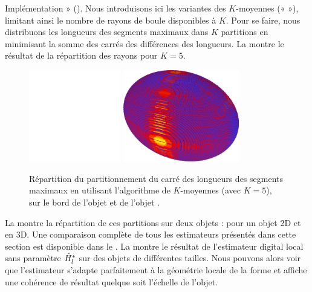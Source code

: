 Implémentation » (). Nous introduisons ici
les variantes des $K$-moyennes («  »), limitant ainsi le
nombre de rayons de boule disponibles à $K$. Pour se faire, nous distribuons les
longueurs des segments maximaux dans $K$ partitions en minimisant la somme des
carrés des différences des longueurs. La 
montre le résultat de la répartition des rayons pour $K=5$.
%
\begin{figure}[ht]{
  \begin{center}
    \includegraphics[height=4cm]{images/Curvature/Flower_kMeans-5}
    \includegraphics[height=4cm]{images/Curvature/Ellipsoid_Radius_2}
  \end{center}}
  \caption[.]{Répartition du partitionnement du carré des longueurs des segments maximaux en utilisant l'algorithme de $K$-moyennes (avec $K=5$), sur le bord de l'objet \Flower et de l'objet \Ellipsoid
  \label{fig:curvature-pfl-map}.}
\end{figure}
%
La  montre la répartition de ces partitions sur deux objets : \Flower pour un objet 2D et \Ellipsoid en 3D.
%
Une comparaison complète de tous les estimateurs présentés dans cette section est disponible dans le . La  montre le résultat de l'estimateur digital local sans paramètre $\hat{H}^{*}_{l}$ sur des objets de différentes tailles. Nous pouvons alors voir que l'estimateur s'adapte parfaitement à la géométrie locale de la forme et affiche une cohérence de résultat quelque soit l'échelle de l'objet.
%
